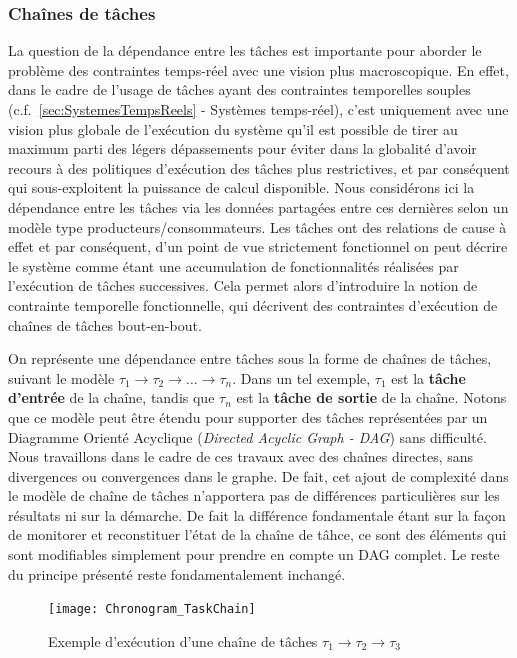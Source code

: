 \documentclass[french, a4paper, 11pt, twoside, pdftex]{StyleThese}
\begin{document}
    	\subsubsection{Chaînes de tâches}
	    La question de la dépendance entre les tâches est importante pour aborder le problème des contraintes temps-réel avec une vision plus macroscopique. En effet, dans le cadre de l'usage de tâches ayant des contraintes temporelles souples (c.f.~\autoref{sec:SystemesTempsReels} - Systèmes temps-réel), c'est uniquement avec une vision plus globale de l'exécution du système qu'il est possible de tirer au maximum parti des légers dépassements pour éviter dans la globalité d'avoir recours à des politiques d'exécution des tâches plus restrictives, et par conséquent qui sous-exploitent la puissance de calcul disponible.
	    Nous considérons ici la dépendance entre les tâches via les données partagées entre ces dernières selon un modèle type producteurs/consommateurs. Les tâches ont des relations de cause à effet et par conséquent, d'un point de vue strictement fonctionnel on peut décrire le système comme étant une accumulation de fonctionnalités réalisées par l'exécution de tâches successives. Cela permet alors d'introduire la notion de contrainte temporelle fonctionnelle, qui décrivent des contraintes d'exécution de chaînes de tâches bout-en-bout.
	    
	    
	    On représente une dépendance entre tâches sous la forme de chaînes de tâches, suivant le modèle $\tau_{1} \rightarrow \tau_2 \rightarrow \ldots \rightarrow \tau_n$. Dans un tel exemple, $\tau_1$ est la \textbf{tâche d'entrée} de la chaîne, tandis que $\tau_n$ est la \textbf{tâche de sortie} de la chaîne. Notons que ce modèle peut être étendu pour supporter des tâches représentées par un Diagramme Orienté Acyclique (\textit{Directed Acyclic Graph - DAG}) sans difficulté. Nous travaillons dans le cadre de ces travaux avec des chaînes directes, sans divergences ou convergences dans le graphe. De fait, cet ajout de complexité dans le modèle de chaîne de tâches n'apportera pas de différences particulières sur les résultats ni sur la démarche. De fait la différence fondamentale étant sur la façon de monitorer et reconstituer l'état de la chaîne de tâhce, ce sont des éléments qui sont modifiables simplement pour prendre en compte un DAG complet. Le reste du principe présenté reste fondamentalement inchangé. 

	    \begin{figure}[ht]
	    	\centering
	    	\texttt{[image: Chronogram\_TaskChain]}
	    	\caption{Exemple d'exécution d'une chaîne de tâches $\tau_1 \rightarrow \tau_2 \rightarrow \tau_3$}
	    	\label{fig:chain_chronogram}
	    \end{figure}
    
\end{document}
